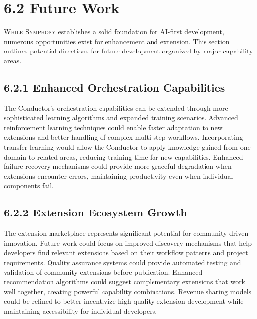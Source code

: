 

\section{6.2 Future Work}
\label{sec:database-impl}

\lettrine{W}{hile Symphony} establishes a solid foundation for AI-first development, numerous opportunities exist for enhancement and extension. This section outlines potential directions for future development organized by major capability areas.

\subsection*{6.2.1 Enhanced Orchestration Capabilities}

The Conductor's orchestration capabilities can be extended through more sophisticated learning algorithms and expanded training scenarios. Advanced reinforcement learning techniques could enable faster adaptation to new extensions and better handling of complex multi-step workflows. Incorporating transfer learning would allow the Conductor to apply knowledge gained from one domain to related areas, reducing training time for new capabilities. Enhanced failure recovery mechanisms could provide more graceful degradation when extensions encounter errors, maintaining productivity even when individual components fail.

\subsection*{6.2.2 Extension Ecosystem Growth}

The extension marketplace represents significant potential for community-driven innovation. Future work could focus on improved discovery mechanisms that help developers find relevant extensions based on their workflow patterns and project requirements. Quality assurance systems could provide automated testing and validation of community extensions before publication. Enhanced recommendation algorithms could suggest complementary extensions that work well together, creating powerful capability combinations. Revenue sharing models could be refined to better incentivize high-quality extension development while maintaining accessibility for individual developers.


